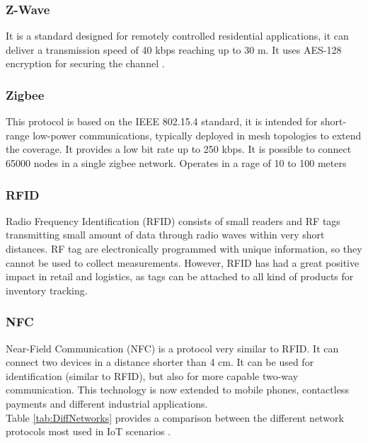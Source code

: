 \subsubsection{Z-Wave}
It is a standard designed for remotely controlled residential applications, it can deliver a transmission speed of 40 kbps reaching up to 30 m. It uses AES-128 encryption for securing the channel \cite{IEEE:protocols2}.

\subsubsection{Zigbee}
This protocol is based on the IEEE 802.15.4 standard, it is intended for short-range low-power communications, typically deployed in mesh topologies to extend the coverage. It provides a low bit rate up to 250 kbps. It is possible to connect 65000 nodes in a single zigbee network. Operates in a rage of 10 to 100 meters 

\subsubsection{RFID}
Radio Frequency Identification (RFID) consists of small readers and RF tags transmitting small amount of data through radio waves within very short distances. RF tag are electronically programmed with unique information, so they cannot be used to collect measurements. However, RFID has had a great positive impact in retail and logistics, as tags can be attached to all kind of products for inventory tracking.

\subsubsection{NFC}
Near-Field Communication (NFC) is a protocol very similar to RFID. It can connect two devices in a distance shorter than 4 cm. It can be used for identification (similar to RFID), but also for more capable two-way communication. This technology is now extended to mobile phones, contactless payments and different industrial applications.\\

Table \ref{tab:DiffNetworks} provides a comparison between the different network protocols most used in IoT scenarios \cite{IEEE:protocols}.

